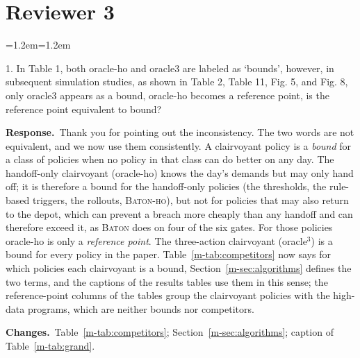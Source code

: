 \documentclass[11pt]{article}
\newenvironment{comment}{\par\medskip\noindent\color{rev}\itshape
  \begin{list}{}{\leftmargin=1.2em\rightmargin=1.2em}\item[]}%
  {\end{list}\par}
\newcommand{\resp}{\par\noindent\textbf{Response.}\ }
\newcommand{\chg}{\par\noindent\textbf{Changes.}\ }
\newcommand{\sref}[1]{Section~\ref{m-#1}}
\newcommand{\tref}[1]{Table~\ref{m-#1}}
\begin{document}
\section*{Reviewer 3}

\begin{comment}
1. In Table 1, both oracle-ho and oracle3 are labeled as `bounds',
however, in subsequent simulation studies, as shown in Table 2, Table 11,
Fig. 5, and Fig. 8, only oracle3 appears as a bound, oracle-ho becomes a
reference point, is the reference point equivalent to bound?
\end{comment}
\resp Thank you for pointing out the inconsistency. The two words are
not equivalent, and we now use them consistently. A clairvoyant policy
is a \emph{bound} for a class of policies when no policy in that class
can do better on any day. The handoff-only clairvoyant (oracle-ho) knows
the day's demands but may only hand off; it is therefore a bound for the
handoff-only policies (the thresholds, the rule-based triggers, the
rollouts, \textsc{Baton-ho}), but not for policies that may also return
to the depot, which can prevent a breach more cheaply than any handoff
and can therefore exceed it, as \textsc{Baton} does on four of the six
gates. For those policies oracle-ho is only a \emph{reference point}.
The three-action clairvoyant (oracle$^3$) is a bound for every policy in
the paper. \tref{tab:competitors} now says for which policies each
clairvoyant is a bound, \sref{sec:algorithms} defines the two terms, and
the captions of the results tables use them in this sense; the
reference-point columns of the tables group the clairvoyant policies
with the high-data programs, which are neither bounds nor competitors.
\chg \tref{tab:competitors}; \sref{sec:algorithms}; caption of
\tref{tab:grand}.
\end{document}
